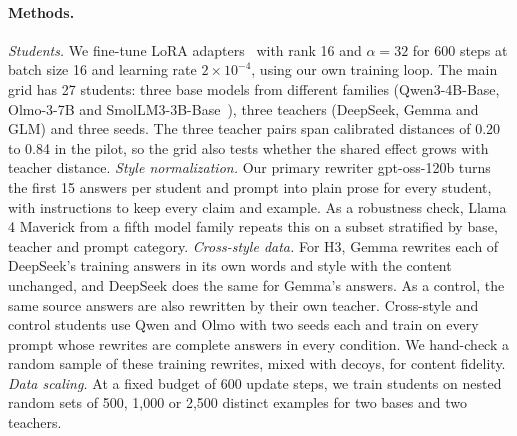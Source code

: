 \documentclass{article}
\begin{document}
\paragraph{Methods.}
\textit{Students.} We fine-tune LoRA adapters~\cite{hu2022lora} with rank 16 and $\alpha=32$ for 600 steps at batch size 16 and learning rate $2\times10^{-4}$, using our own training loop. The main grid has 27 students: three base models from different families (Qwen3-4B-Base, Olmo-3-7B and SmolLM3-3B-Base~\cite{smollm3}), three teachers (DeepSeek, Gemma and GLM) and three seeds. The three teacher pairs span calibrated distances of 0.20 to 0.84 in the pilot, so the grid also tests whether the shared effect grows with teacher distance.
\textit{Style normalization.} Our primary rewriter gpt-oss-120b turns the first 15 answers per student and prompt into plain prose for every student, with instructions to keep every claim and example. As a robustness check, Llama 4 Maverick from a fifth model family repeats this on a subset stratified by base, teacher and prompt category.
\textit{Cross-style data.} For H3, Gemma rewrites each of DeepSeek's training answers in its own words and style with the content unchanged, and DeepSeek does the same for Gemma's answers. As a control, the same source answers are also rewritten by their own teacher. Cross-style and control students use Qwen and Olmo with two seeds each and train on every prompt whose rewrites are complete answers in every condition. We hand-check a random sample of these training rewrites, mixed with decoys, for content fidelity.
\textit{Data scaling.} At a fixed budget of 600 update steps, we train students on nested random sets of 500, 1,000 or 2,500 distinct examples for two bases and two teachers.
\end{document}
